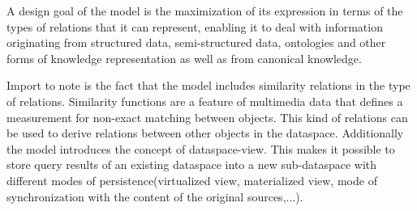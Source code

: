 A design goal of the model is the maximization of its expression in terms of the types of relations that it can represent, enabling it to deal with information originating from structured data, semi-structured data, ontologies and other forms of knowledge representation as well as from canonical  
knowledge.

Import to note is the fact that the model includes similarity relations in the type of relations. 
Similarity functions are a feature of multimedia data that defines a measurement for non-exact matching between objects.
This kind of relations can be used to derive relations between other objects in the dataspace.
Additionally the model introduces the concept of dataspace-view. 
This makes it possible to store query results of an existing dataspace into a new sub-dataspace with different modes of persistence(virtualized view, materialized view, mode of synchronization with the content of the original sources,...).\\